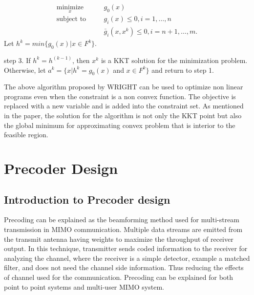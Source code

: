 \documentclass[a4paper, 12pt,titlepage]{dithesis} %
\newcommand{\me}[1]{\( #1 \)}
\begin{document}
\begin{eqnarray}
\underset{x}{\text{minimize}} \quad && g_0(x) \\
\text{subject to} \quad && g_i(x) \leq 0, i = 1,\dotsc,n\\
&& \bar{g}_i(x,x^k) \leq 0, i = n + 1,\dotsc,m.
\end{eqnarray} 
Let \me{h^k = min \lbrace g_0(x)|x \in F^k \rbrace}.\\
\par
step 3. If \me{h^k = h^(k-1)}, then \me{x^k} is a \ac{KKT} solution for the minimization problem. Otherwise, let \me{a^k = \lbrace x|h^k = g_0(x)} and \me{x \in F^k \rbrace} and return to step 1.\\
\par
The above algorithm proposed by WRIGHT can be used to optimize non linear programs even when the constraint is a non convex function. The objective is replaced with a new variable and is added into the constraint set. As mentioned in the paper, the solution for the algorithm is not only the \ac{KKT} point but also the global minimum for approximating convex problem that is interior to the feasible region.






\chapter{Precoder Design} 

\section{Introduction to Precoder design}

Precoding can be explained as the beamforming method used for multi-stream transmission in \ac{MIMO} communication. Multiple data streams are emitted from the transmit antenna having weights to maximize the throughput of receiver output. In this technique, transmitter sends coded information to the receiver for analyzing the channel, where the receiver is a simple detector, example a matched filter, and does not need the channel side information. Thus reducing the effects of channel used for the communication. Precoding can be explained for both point to point systems and multi-user \ac{MIMO} system.
\end{document}

